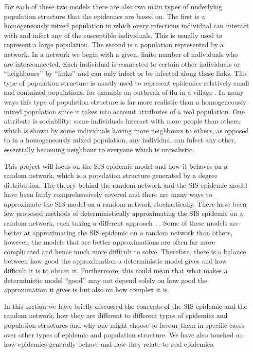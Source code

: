 \documentclass{uonmathsreport}
\begin{document}
For each of these two models there are also two main types of underlying population structure that the epidemics are based on. The first is a homogeneously mixed population in which every infectious individual can interact with and infect any of the susceptible individuals. This is usually used to represent a large population. The second is a population represented by a network. In a network we begin with a given, finite number of individuals who are interconnected. Each individual is connected to certain other individuals or ``neighbours’’ by ``links’’ and can only infect or be infected along these links. This type of population structure is mostly used to represent epidemics relatively small and contained populations, for example an outbreak of flu in a village \cite{bibandersson2}. In many ways this type of population structure is far more realistic than a homogeneously mixed population since it takes into account attributes of a real population. One attribute is sociability: some individuals interact with more people than others, which is shown by some individuals having more neighbours to others, as opposed to in a homogeneously mixed population, any individual can infect any other, essentially becoming neighbour to everyone which is unrealistic.
	
This project will focus on the SIS epidemic model and how it behaves on a random network, which is a population structure generated by a degree distribution. The theory behind the random network and the SIS epidemic model have been fairly comprehensively covered and there are many ways to approximate the SIS model on a random network stochastically. There have been few proposed methods of deterministically approximating the SIS epidemic on a random network, each taking a different approach \cite{bibgray}, \cite{bibpan}. Some of these models are better at approximating the SIS epidemic on a random network than others, however, the models that are better approximations are often far more complicated and hence much more difficult to solve. Therefore, there is a balance between how good the approximation a deterministic model gives and how difficult it is to obtain it. Furthermore, this could mean that what makes a deterministic model ``good'' may not depend solely on how good the approximation it gives is but also on how complex it is.

In this section we have briefly discussed the concepts of the SIS epidemic and the random network, how they are different to different types of epidemics and population structures and why one might choose to favour them in specific cases over other types of epidemic and population structure. We have also touched on how epidemics generally behave and how they relate to real epidemics.
\end{document}
